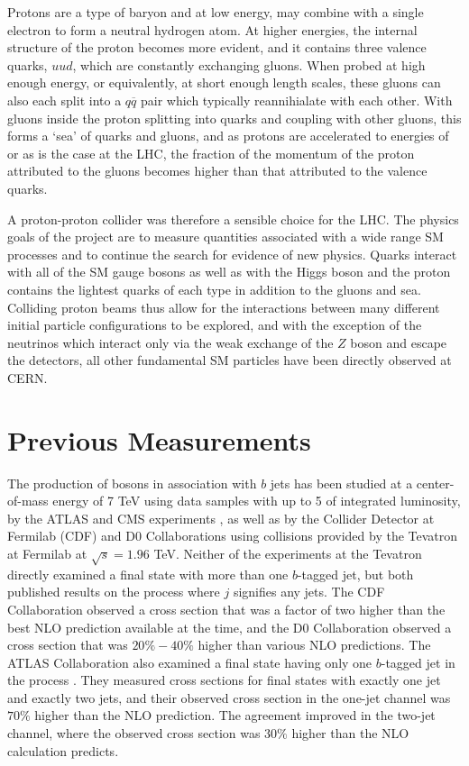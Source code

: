  Protons are a type of baryon and
  at low energy, may combine with a single electron 
  to form a neutral hydrogen atom.
 At higher energies, the internal structure 
  of the proton becomes more evident,
  and it contains three valence quarks, $uud$, 
  which are constantly exchanging gluons.
 When probed at high enough energy, or equivalently,
  at short enough length scales, these 
  gluons can also each split into a $q\overline{q}$ pair 
  which typically reannihialate with each other.
 With gluons inside the proton splitting into quarks
  and coupling with other gluons,
  this forms a `sea' of quarks and gluons,
  and as protons are accelerated
  to energies of \GeV or \TeV as is the case at the
  LHC, the fraction of the momentum of the
  proton attributed to the gluons becomes higher 
  than that attributed to the valence quarks.

 A proton-proton collider was therefore a 
  sensible choice for the LHC. 
 The physics goals of the project are
  to measure quantities associated with a wide range SM 
  processes and to continue the search for 
  evidence of new physics.
 Quarks interact with all of the SM gauge bosons
  as well as with the Higgs boson
  and the proton contains the lightest
  quarks of each type
  in addition to the gluons and sea.
 Colliding proton beams thus allow for
  the interactions between many different
  initial particle configurations to be explored,
  and with the exception of the neutrinos which 
  interact only via the weak exchange of the $Z$
  boson and escape the detectors,
  all other fundamental SM particles have been
  directly  observed  at CERN. 

\section{Previous \wbb Measurements}

The production of
 \w bosons
 in association with $b$ jets has been 
 studied at a center-of-mass
 energy of 7 TeV using data samples with up
 to 5 \fbinv of integrated luminosity,
 by the ATLAS and CMS experiments \cite{Chatrchyan:2013uza,Aad:2013vka}, 
 as well as by the Collider Detector at Fermilab (CDF)
 and D0 Collaborations using \ppbar collisions
 provided by the Tevatron \cite{WbbTevD0,WbbTevCDF} at  
 Fermilab at $\sqrt{s}=1.96$ TeV. 
Neither of the experiments at the Tevatron
 directly examined a final state with 
 more than one $b$-tagged jet, 
 but both published results on the 
 process \ppbarwbjlnbj where $j$ signifies
 any jets.
The CDF Collaboration observed a cross section
 that was a factor of two higher than the best
 NLO prediction available at the time, and the 
 D0 Collaboration observed a cross section 
 that was $20\% - 40\%$ higher than 
 various NLO predictions.
The ATLAS Collaboration also examined a
 final state having only one $b$-tagged jet 
 in the process \ppwblnb.
They measured cross sections for 
 final states with
 exactly one jet 
 and exactly two jets, and 
 their observed cross section in the 
 one-jet channel was $70\%$ higher than the NLO prediction.
The agreement improved in the two-jet channel,
 where the observed cross section was $30\%$ higher
 than the NLO calculation predicts.

